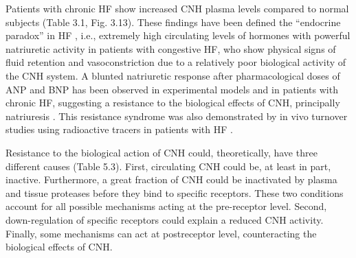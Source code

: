 \documentclass[14pt,a4paper,onecolumn]{extarticle}
\begin{document}

Patients with chronic HF show increased CNH plasma levels compared to normal subjects (Table 3.1, Fig. 3.13). These findings have been defined the “endocrine paradox” in HF \citep{bib36}, i.e., extremely high circulating levels of hormones with powerful natriuretic activity in patients with congestive HF, who show physical signs of fluid retention and vasoconstriction due to a relatively poor biological activity of the CNH system. A blunted natriuretic response after pharmacological doses of ANP and BNP has been observed in experimental models and in patients with chronic HF, suggesting a resistance to the biological effects of CNH, principally natriuresis \citep{bib327} \citep{bib325} \citep{bib333} \citep{bib327} \citep{bib328} \citep{bib329} \citep{bib330} \citep{bib331}. This resistance syndrome was also demonstrated by in vivo turnover studies using radioactive tracers in patients with HF \citep{bib332} \citep{bib333}.

Resistance to the biological action of CNH could, theoretically, have three different causes (Table 5.3). First, circulating CNH could be, at least in part, inactive. Furthermore, a great fraction of CNH could be inactivated by plasma and tissue proteases before they bind to specific receptors. These two conditions account for all possible mechanisms acting at the pre-receptor level. Second, down-regulation of specific receptors could explain a reduced CNH activity. Finally, some mechanisms can act at postreceptor level, counteracting the biological effects of CNH.

\end{document}
